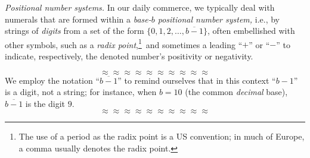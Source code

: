 \noindent
{\it Positional number systems.}
%
In our daily commerce, we typically deal with numerals that are formed
within a {\it base-$b$ positional number system,}
%
i.e., by strings of {\it digits} from a set of the form $\{0, 1, 2,
\ldots, \overline{b-1}\}$, often embellished with other symbols, such as
a {\em radix point},\footnote{The use of a period as the radix point
  is a US convention; in much of Europe, a comma usually denotes the
  radix point.}~and sometimes a leading ``$+$'' or ``$-$'' to
indicate, respectively, the denoted number's positivity or negativity.

\[ \approx \approx \approx \approx \approx \approx \approx \approx \approx \approx \]
We employ the notation ``$\overline{b-1}$'' to remind ourselves that
in this context ``$b-1$'' is a digit, not a string; for instance, when
$b = 10$ (the common {\em decimal} base), $\overline{b-1}$ is the
digit $9$.
\[ \approx \approx \approx \approx \approx \approx \approx \approx \approx \approx \]

